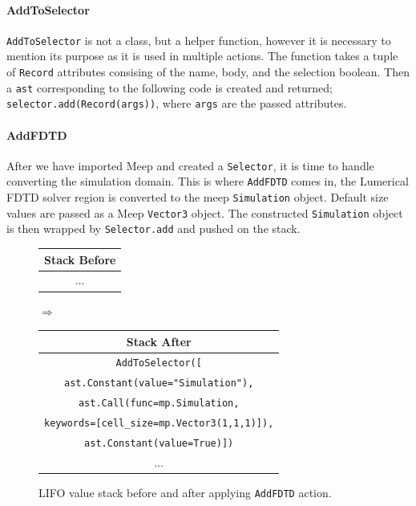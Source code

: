 \paragraph{AddToSelector}
\texttt{AddToSelector} is not a class, but a helper function, however it is necessary to mention its purpose as it is used in multiple actions. The function takes a tuple of \texttt{Record} attributes consising of the name, body, and the selection boolean. Then a \texttt{ast} corresponding to the following code is created and returned; \texttt{selector.add(Record(args))}, where \texttt{args} are the passed attributes.

\paragraph{AddFDTD}
After we have imported Meep and created a \texttt{Selector}, it is time to handle converting the simulation domain. This is where \texttt{AddFDTD} comes in, the Lumerical FDTD solver region is converted to the meep \texttt{Simulation} object. Default size values are passed as a Meep \texttt{Vector3} object. The constructed \texttt{Simulation} object is then wrapped by \texttt{Selector.add} and pushed on the stack.

\begin{figure}[H]\label{fig:addfdtd-stack}
  \centering
  {\small
  \begin{tabular}{|c|}
    \hline
    \textbf{Stack Before} \\ \hline
    \(\dots\) \\ \hline
  \end{tabular}
  \hspace{0.25em}$\Longrightarrow$\hspace{0.25em}
  \begin{tabular}{|c|}
    \hline
    \textbf{Stack After} \\ \hline
    \texttt{AddToSelector([}\\
    \texttt{\tiny{ast.}}\texttt{Constant(value="Simulation"),}\\
    \texttt{\tiny{ast.}}\texttt{Call(func=mp.Simulation,}\\
    \texttt{keywords=[cell\_size=mp.Vector3(1,1,1)]),}\\
    \texttt{\tiny{ast.}}\texttt{Constant(value=True)])} \\ \hline
    \(\dots\) \\ \hline
  \end{tabular}
  }
  \caption{LIFO value stack before and after applying \texttt{AddFDTD} action.}
\end{figure}


